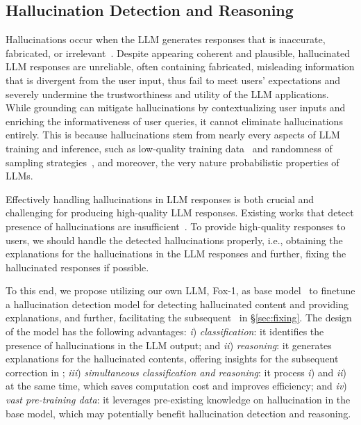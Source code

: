 \subsection{Hallucination Detection and Reasoning}\label{sec: hallucination_detection_and_reasoning}








Hallucinations occur when the LLM generates responses that is inaccurate, fabricated, or irrelevant~\citep{filippova2020controlled, maynez2020faithfulness,huang2023survey,rawte2023survey}.
Despite appearing coherent and plausible, hallucinated LLM responses are unreliable, often containing fabricated, misleading information that is  
divergent from the user input, thus fail to meet users' expectations and severely undermine the trustworthiness and utility of the LLM applications.
While grounding can mitigate hallucinations by contextualizing user inputs and enriching the informativeness of user queries, it cannot eliminate hallucinations entirely. 
This is because hallucinations stem from nearly every aspects of LLM training and inference, such as low-quality training data~\citep{lin2021truthfulqa,kang2023impact} and %
randomness of sampling strategies~\citep{chuang2023dola}, and moreover, the very nature probabilistic properties of LLMs. 

Effectively handling hallucinations in LLM responses is both crucial and challenging for producing high-quality LLM responses. 
Existing works that detect presence of hallucinations are insufficient~\citep{manakul2023selfcheckgpt,liu2021token}. To provide high-quality responses to users,  we should handle the detected hallucinations properly, i.e., obtaining the explanations for the hallucinations in the LLM responses and further, fixing the hallucinated responses if possible. 


To this end, we propose utilizing our own LLM, Fox-1, as base model~\citep{fox} to finetune a 
hallucination detection model  for detecting hallucinated content and providing explanations, and further, facilitating the subsequent \fixing~in \S\ref{sec:fixing}. The design of the model has the following advantages: \textit{i}) \textit{classification}: it identifies the presence of hallucinations in the LLM output; and \textit{ii}) \textit{reasoning}: it generates explanations for the hallucinated contents, offering insights for the subsequent correction in \fixing; \textit{iii}) \textit{simultaneous classification and reasoning}: it process \textit{i}) and \textit{ii}) at the same time, which saves computation cost and improves efficiency; and \textit{iv}) \textit{vast pre-training data}: it leverages pre-existing knowledge
on hallucination in the base model, which may potentially benefit hallucination detection and reasoning.



